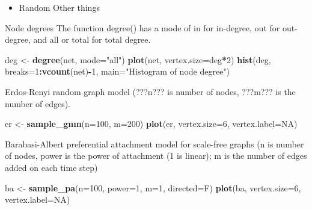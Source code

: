 \documentclass[]{article}
\newenvironment{Shaded}{\begin{snugshade}}{\end{snugshade}}
\newcommand{\DataTypeTok}[1]{\textcolor[rgb]{0.13,0.29,0.53}{#1}}
\newcommand{\DecValTok}[1]{\textcolor[rgb]{0.00,0.00,0.81}{#1}}
\newcommand{\KeywordTok}[1]{\textcolor[rgb]{0.13,0.29,0.53}{\textbf{#1}}}
\newcommand{\NormalTok}[1]{#1}
\newcommand{\OperatorTok}[1]{\textcolor[rgb]{0.81,0.36,0.00}{\textbf{#1}}}
\newcommand{\OtherTok}[1]{\textcolor[rgb]{0.56,0.35,0.01}{#1}}
\newcommand{\StringTok}[1]{\textcolor[rgb]{0.31,0.60,0.02}{#1}}
\providecommand{\tightlist}{%
  \setlength{\itemsep}{0pt}\setlength{\parskip}{0pt}}
\begin{document}
\begin{itemize}
\tightlist
\item
  Random Other things
\end{itemize}

Node degrees The function degree() has a mode of in for in-degree, out
for out-degree, and all or total for total degree.

\begin{Shaded}
\begin{Highlighting}[]
\NormalTok{deg <-}\StringTok{ }\KeywordTok{degree}\NormalTok{(net, }\DataTypeTok{mode=}\StringTok{"all"}\NormalTok{)}
\KeywordTok{plot}\NormalTok{(net, }\DataTypeTok{vertex.size=}\NormalTok{deg}\OperatorTok{*}\DecValTok{2}\NormalTok{)}
\KeywordTok{hist}\NormalTok{(deg, }\DataTypeTok{breaks=}\DecValTok{1}\OperatorTok{:}\KeywordTok{vcount}\NormalTok{(net)}\OperatorTok{-}\DecValTok{1}\NormalTok{, }\DataTypeTok{main=}\StringTok{"Histogram of node degree"}\NormalTok{)}
\end{Highlighting}
\end{Shaded}

Erdos-Renyi random graph model (???n??? is number of nodes, ???m??? is
the number of edges).

\begin{Shaded}
\begin{Highlighting}[]
\NormalTok{er <-}\StringTok{ }\KeywordTok{sample_gnm}\NormalTok{(}\DataTypeTok{n=}\DecValTok{100}\NormalTok{, }\DataTypeTok{m=}\DecValTok{200}\NormalTok{)}
\KeywordTok{plot}\NormalTok{(er, }\DataTypeTok{vertex.size=}\DecValTok{6}\NormalTok{, }\DataTypeTok{vertex.label=}\OtherTok{NA}\NormalTok{)}
\end{Highlighting}
\end{Shaded}

Barabasi-Albert preferential attachment model for scale-free graphs (n
is number of nodes, power is the power of attachment (1 is linear); m is
the number of edges added on each time step)

\begin{Shaded}
\begin{Highlighting}[]
\NormalTok{ba <-}\StringTok{ }\KeywordTok{sample_pa}\NormalTok{(}\DataTypeTok{n=}\DecValTok{100}\NormalTok{, }\DataTypeTok{power=}\DecValTok{1}\NormalTok{, }\DataTypeTok{m=}\DecValTok{1}\NormalTok{, }\DataTypeTok{directed=}\NormalTok{F)}
\KeywordTok{plot}\NormalTok{(ba, }\DataTypeTok{vertex.size=}\DecValTok{6}\NormalTok{, }\DataTypeTok{vertex.label=}\OtherTok{NA}\NormalTok{)}
\end{Highlighting}
\end{Shaded}
\end{document}
